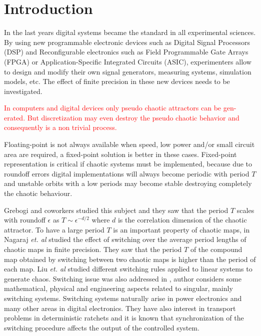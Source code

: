 \section{Introduction} \label{sec:intro}

In the last years digital systems became the standard in all experimental sciences.
By using new programmable electronic devices such as Digital Signal Processors (DSP) and Reconfigurable electronics such as Field Programmable Gate Arrays (FPGA) or Application-Specific Integrated Circuits (ASIC), experimenters allow to design and modify their own signal generators, measuring systems, simulation models, etc.
The effect of finite precision in these new devices needs to be investigated.

\textcolor{red}{
In computers and digital devices only pseudo chaotic attractors can be gen-
erated. But discretization may even destroy the pseudo chaotic behavior and
consequently is a non trivial process.
}


Floating-point is not always available when speed, low power and/or small circuit area are required, a fixed-point solution is better in these cases.
Fixed-point representation is critical if chaotic systems must be implemented, because due to roundoff errors digital implementations will always become periodic with period $T$ and unstable orbits with a low periods may become stable destroying completely the chaotic behaviour.

Grebogi and coworkers \cite{Grebogi1988} studied this subject and they saw that the period $T$ scales with roundoff $\epsilon$ as $T\sim\epsilon^{-d/2}$ where $d$ is the correlation dimension of the chaotic attractor.
To have a large period $T$ is an important property of chaotic maps, in \cite{Nagaraj2008} Nagaraj \textit{et. al} studied the effect of switching over the average period lengths of chaotic maps in finite precision.
They saw that the period $T$ of the compound map obtained by switching between two chaotic maps is higher than the period of each map.
Liu \textit{et. al} \cite{Liu2006} studied different switching rules applied to linear systems to generate chaos.
Switching issue was also addressed in \cite{Gluskin2008}, author considers some mathematical, physical and engineering aspects related to singular, mainly switching systems.
Switching systems naturally arise in power electronics and many other areas in digital electronics.
They have also interest in transport problems in deterministic ratchets \cite{Zarlenga2009} and it is known that synchronization of the switching procedure affects the output of the controlled system.

